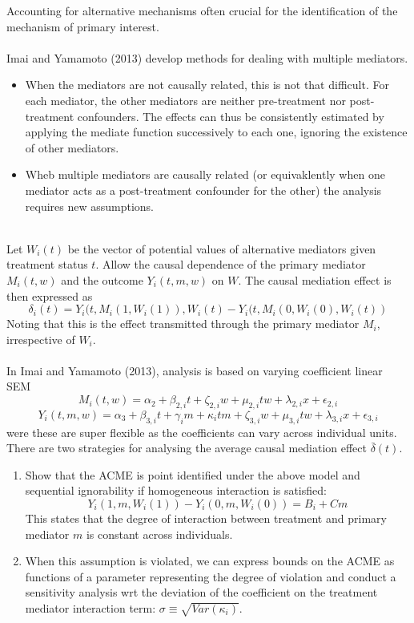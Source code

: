 \documentclass{article}
\begin{document}
	Accounting for alternative mechanisms often crucial for the identification of the mechanism of primary interest. 
	\\~\\
	Imai and Yamamoto (2013) develop methods for dealing with multiple mediators. 
	\begin{itemize}
		\item When the mediators are not causally related, this is not that difficult. For each mediator, the other mediators are neither pre-treatment nor post-treatment confounders. The effects can thus be consistently estimated by applying the mediate function successively to each one, ignoring the existence of other mediators.
		\item Wheb multiple mediators are causally related (or equivaklently when one mediator acts as a post-treatment confounder for the other) the analysis requires new assumptions. 
	\end{itemize}
	~\\
	Let $W_i(t)$ be the vector of potential values of alternative mediators given treatment status $t$. Allow the causal dependence of the primary mediator $M_i(t,w)$ and the outcome $Y_i(t,m,w)$ on $W$. The causal mediation effect is then expressed as 
	$$
	\delta_i(t) = Y_i(t, M_i(1, W_i(1)), W_i(t) - Y_i(t, M_i(0, W_i(0), W_i(t))
	$$
	Noting that this is the effect transmitted through the primary mediator $M_i$, irrespective of $W_i$. 
	\\~\\
	In Imai and Yamamoto (2013), analysis is based on varying coefficient linear SEM
	$$
	M_i(t,w) = \alpha_2 + \beta_{2,i}t + \zeta_{2,i} w + \mu_{2,i} t w + \lambda_{2,i} x + \epsilon_{2,i}
	$$
	$$
	Y_i(t,m,w) = \alpha_3 + \beta_{3,i}t + \gamma_i m + \kappa_i t m + \zeta_{3,i} w + \mu_{3,i}tw + \lambda_{3,i} x + \epsilon_{3,i}
	$$
	were these are super flexible as the coefficients can vary across individual units. There are two strategies for analysing the average causal mediation effect $\bar{\delta}(t)$.
	\begin{enumerate}
		\item Show that the ACME is point identified under the above model and sequential ignorability if homogeneous interaction is satisfied:
		$$
		Y_i(1,m,W_i(1)) - Y_i(0,m,W_i(0)) = B_i + Cm
		$$
		This states that the degree of interaction between treatment and primary mediator $m$ is constant across individuals.
		\item When this assumption is violated, we can express bounds on the ACME as functions of a parameter representing the degree of violation and conduct a sensitivity analysis wrt the deviation of the coefficient on the treatment mediator interaction term: $\sigma \equiv \sqrt{Var(\kappa_i)}$.
	\end{enumerate}
	
\end{document}
